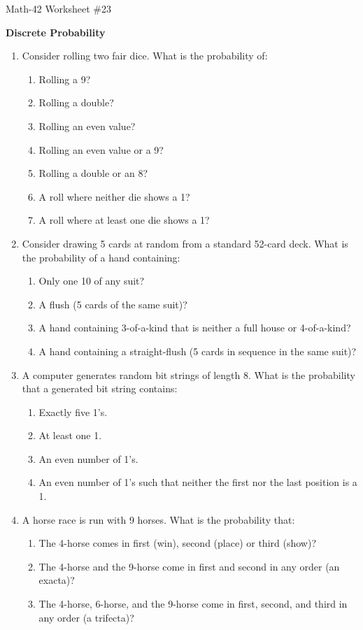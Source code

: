 \documentclass[letterpaper,12pt,fleqn]{article}
\begin{document}
\begin{center}
  \large Math-42 Worksheet \#23

  \textbf{Discrete Probability}
\end{center}

\vspace{0.5in}

\begin{enumerate}[left=0in,itemsep=0.5in]
\item Consider rolling two fair dice.  What is the probability of:
  \begin{enumerate}
  \item Rolling a 9?
  \item Rolling a double?
  \item Rolling an even value?
  \item Rolling an even value or a 9?
  \item Rolling a double or an 8?
  \item A roll where neither die shows a 1?
  \item A roll where at least one die shows a 1?
  \end{enumerate}

\item Consider drawing 5 cards at random from a standard 52-card deck.  What is the probability of a hand containing:
  \begin{enumerate}
  \item Only one 10 of any suit?
  \item A flush (5 cards of the same suit)?
  \item A hand containing 3-of-a-kind that is neither a full house or 4-of-a-kind?
  \item A hand containing a straight-flush (5 cards in sequence in the same suit)?
  \end{enumerate}

\item A computer generates random bit strings of length 8.  What is the probability that a generated bit string
  contains:
  \begin{enumerate}
  \item Exactly five 1's.
  \item At least one 1.
  \item An even number of 1's.
  \item An even number of 1's such that neither the first nor the last position is a 1.
  \end{enumerate}

\item A horse race is run with 9 horses.  What is the probability that:
  \begin{enumerate}
  \item The 4-horse comes in first (win), second (place) or third (show)?
  \item The 4-horse and the 9-horse come in first and second in any order (an exacta)?
  \item The 4-horse, 6-horse, and the 9-horse come in first, second, and third in any order (a trifecta)?
  \end{enumerate}


\end{enumerate}
\end{document}
